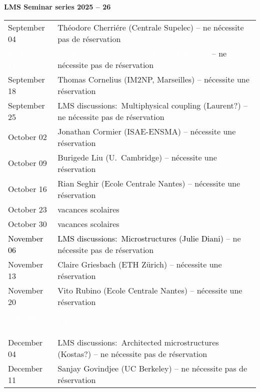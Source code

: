 \documentclass[a4paper,11pt,fleqn]{article}
\begin{document}
	\sffamily
	\thispagestyle{titlepage}
	\vspace*{-2em}
	\begin{center}
		\huge \textbf{LMS Seminar series 2025 -- 26}
	\end{center}
	\vspace*{1em}
	\begin{center}
		\Large 
		\begin{tabular}{| p{4.5cm} p{12cm} |}
			\hline
			September 04 &  Th{\'e}odore Cherri{\'e}re (Centrale Supelec) -- {\color{olive} ne nécessite pas de réservation}\\
			\rowcolor{docColor!99}
			\textcolor{white}{September 11} &  \textcolor{white}{Conf{\'e}rence en hommage {\`a} Laurent Jacquin} -- {\color{green} ne nécessite pas de réservation}\\
			September 18 &  Thomas Cornelius (IM2NP, Marseilles) -- {\color{red}nécessite une réservation}\\
			\rowcolor{cyan}
			{September 25} & {LMS discussions:~Multiphysical coupling (Laurent?)} -- {\color{olive} ne nécessite pas de réservation} \\
			October 02 &  Jonathan Cormier (ISAE-ENSMA) -- {\color{red} nécessite une réservation} \\
			October 09 &  Burigede Liu (U.~Cambridge) -- {\color{red} nécessite une réservation} \\
			October 16 &  Rian Seghir (Ecole Centrale Nantes) -- {\color{red} nécessite une réservation}\\
			October 23 &  vacances scolaires \\
			October 30 & vacances scolaires \\
			\rowcolor{cyan}
			\textcolor{black}{November 06} & \textcolor{black}{LMS discussions:~Microstructures (Julie Diani)} -- {\color{green}ne nécessite pas de réservation}\\
			November 13 &  Claire Griesbach (ETH Z{\"u}rich) -- {\color{red}nécessite une réservation}\\
			November 20 &  Vito Rubino (Ecole Centrale Nantes) -- {\color{red} nécessite une réservation}\\
			\rowcolor{docColor!99}
			\textcolor{white}{November 27} &  \textcolor{white}{MECA seminar:~} \\
			\rowcolor{cyan}
			{December 04} &  {LMS discussions:~Architected microstructures (Kostas?)} --  {\color{green}ne nécessite pas de réservation}\\
			December 11 &  Sanjay Govindjee (UC Berkeley) -- {\color{olive}ne nécessite pas de réservation}\\
			\hline
		\end{tabular}
	\end{center}
	
\end{document}
